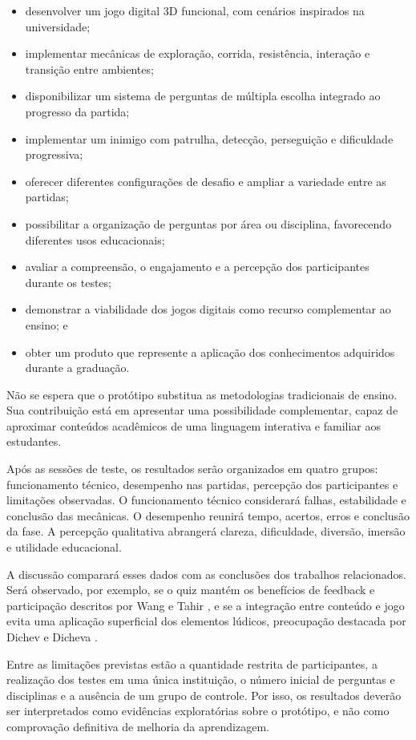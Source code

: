 \documentclass[12pt]{article}
\begin{document}
\begin{itemize}[leftmargin=1.2cm]
    \item desenvolver um jogo digital 3D funcional, com cenários inspirados na universidade;
    \item implementar mecânicas de exploração, corrida, resistência, interação e transição entre ambientes;
    \item disponibilizar um sistema de perguntas de múltipla escolha integrado ao progresso da partida;
    \item implementar um inimigo com patrulha, detecção, perseguição e dificuldade progressiva;
    \item oferecer diferentes configurações de desafio e ampliar a variedade entre as partidas;
    \item possibilitar a organização de perguntas por área ou disciplina, favorecendo diferentes usos educacionais;
    \item avaliar a compreensão, o engajamento e a percepção dos participantes durante os testes;
    \item demonstrar a viabilidade dos jogos digitais como recurso complementar ao ensino; e
    \item obter um produto que represente a aplicação dos conhecimentos adquiridos durante a graduação.
\end{itemize}

Não se espera que o protótipo substitua as metodologias tradicionais de ensino. Sua contribuição está em apresentar uma possibilidade complementar, capaz de aproximar conteúdos acadêmicos de uma linguagem interativa e familiar aos estudantes.

Após as sessões de teste, os resultados serão organizados em quatro grupos: funcionamento técnico, desempenho nas partidas, percepção dos participantes e limitações observadas. O funcionamento técnico considerará falhas, estabilidade e conclusão das mecânicas. O desempenho reunirá tempo, acertos, erros e conclusão da fase. A percepção qualitativa abrangerá clareza, dificuldade, diversão, imersão e utilidade educacional.

A discussão comparará esses dados com as conclusões dos trabalhos relacionados. Será observado, por exemplo, se o quiz mantém os benefícios de feedback e participação descritos por Wang e Tahir \cite{wang2020}, e se a integração entre conteúdo e jogo evita uma aplicação superficial dos elementos lúdicos, preocupação destacada por Dichev e Dicheva \cite{dichev2017}.

Entre as limitações previstas estão a quantidade restrita de participantes, a realização dos testes em uma única instituição, o número inicial de perguntas e disciplinas e a ausência de um grupo de controle. Por isso, os resultados deverão ser interpretados como evidências exploratórias sobre o protótipo, e não como comprovação definitiva de melhoria da aprendizagem.
\end{document}
